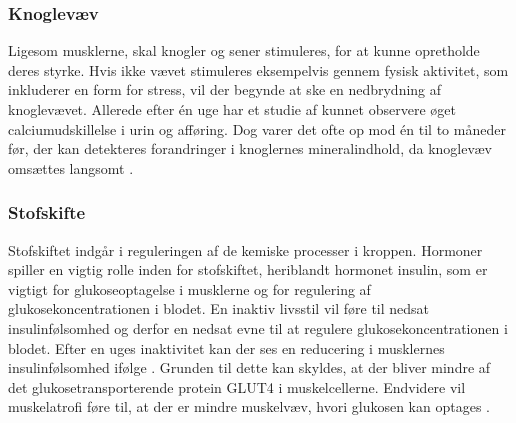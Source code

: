 \subsubsection{Knoglevæv}
Ligesom musklerne, skal knogler og sener stimuleres, for at kunne opretholde deres styrke. 
Hvis ikke vævet stimuleres eksempelvis gennem fysisk aktivitet, som inkluderer en form for stress, vil der begynde at ske en nedbrydning af knoglevævet. 
Allerede efter én uge har et studie af \citeauthor{Bloomfield1995} kunnet observere øget calciumudskillelse i urin og afføring. 
Dog varer det ofte op mod én til to måneder før, der kan detekteres forandringer i knoglernes mineralindhold, da knoglevæv omsættes langsomt \citep{Bloomfield1995}.

\subsubsection{Stofskifte}
Stofskiftet indgår i reguleringen af de kemiske processer i kroppen. 
Hormoner spiller en vigtig rolle inden for stofskiftet, heriblandt hormonet insulin, som er vigtigt for glukoseoptagelse i musklerne og for regulering af glukosekoncentrationen i blodet. 
En inaktiv livsstil vil føre til nedsat insulinfølsomhed og derfor en nedsat evne til at regulere glukosekoncentrationen i blodet. 
Efter en uges inaktivitet kan der ses en reducering i musklernes insulinfølsomhed ifølge  \citeauthor{Mikines1991}. 
Grunden til dette kan skyldes, at der bliver mindre af det glukosetransporterende protein GLUT4 i muskelcellerne. 
Endvidere vil muskelatrofi føre til, at der er mindre muskelvæv, hvori glukosen kan optages \citep{Tabata1999}.